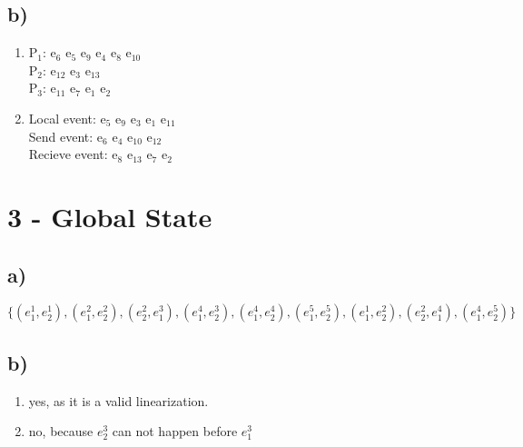 \documentclass{scrartcl}
\begin{document}
\subsection*{b)}
\begin{enumerate}[label=(\roman*)]
	\item 
	P$_1$: e$_6$ e$_5$ e$_9$ e$_4$ e$_8$ e$_{10}$\\
	P$_2$: e$_{12}$ e$_3$ e$_{13}$\\
	P$_3$: e$_{11}$ e$_7$ e$_1$ e$_2$\\
	\item 
	Local event: e$_5$ e$_9$ e$_3$ e$_1$ e$_{11}$\\
	Send event: e$_6$ e$_4$ e$_{10}$ e$_{12}$\\
	Recieve event:  e$_8$ e$_{13}$ e$_7$ e$_2$\\
\end{enumerate}

\section*{3 - Global State}
\subsection*{a)}
$ \{(e^{1}_{1}, e^{1}_{2}), (e^{2}_{1}, e^{2}_{2}), (e^{2}_{2}, e^{3}_{1}), (e^{4}_{1}, e^{3}_{2}), (e^{4}_{1}, e^{4}_{2}), (e^{5}_{1}, e^{5}_{2}), (e^{1}_{1}, e^{2}_{2}), (e^{2}_{2}, e^{4}_{1}), (e^{4}_{1}, e^{5}_{2})\} $

\subsection*{b)}
\begin{enumerate}
	\item yes, as it is a valid linearization.
	\item no, because $ e_{2}^{3} $ can not happen before $ e_{1}^{3} $
\end{enumerate}
\end{document}
